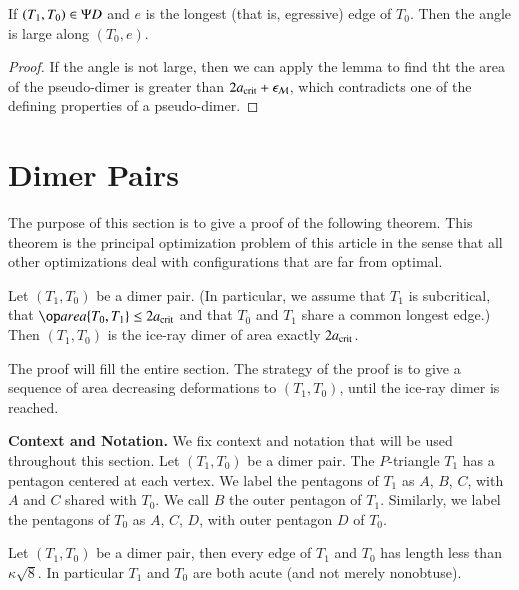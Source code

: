 \begin{corollary}
  If $(T_1,T_0)\in \Psi D$ and $e$ is the longest (that is, egressive)
  edge of $T_0$.  Then the angle is large along $(T_0,e)$.
\end{corollary}

\begin{proof} 
  If the angle is not large, then we can apply the lemma to find tht
  the area of the pseudo-dimer is greater than $2a_\text{crit} + \epsilon_{\mathcal M}$,
  which contradicts one of the defining properties of a pseudo-dimer.
\end{proof}



\section{Dimer Pairs}

The purpose of this section is to give a proof of the following
theorem.  This theorem is the principal optimization problem of this
article in the sense that all other optimizations deal with
configurations that are far from optimal.


\begin{theorem}
  Let $(T_1,T_0)$ be a dimer pair.  (In particular, we assume that
  $T_1$ is subcritical, that $\area\{T_0,T_1\}\le 2\acrit$ and that
  $T_0$ and $T_1$ share a common longest edge.)  Then $(T_1,T_0)$ is
  the ice-ray dimer of area exactly $2a_\text{crit}$.
\end{theorem}

The proof will fill the entire section.  The strategy of the proof is
to give a sequence of area decreasing deformations to $(T_1,T_0)$,
until the ice-ray dimer is reached.


\noindent
{\bf Context and Notation.} We fix context and
notation that will be used throughout this section. Let
$(T_1,T_0)$ be a dimer pair.  The $P$-triangle $T_1$ has a pentagon
centered at each vertex.  We label the pentagons of $T_1$ as $A$, $B$,
$C$, with $A$ and $C$ shared with $T_0$.  We call $B$ the outer
pentagon of $T_1$.  Similarly, we label the pentagons of $T_0$ as $A$,
$C$, $D$, with outer pentagon $D$ of $T_0$.


\begin{lemma}  
  Let $(T_1,T_0)$ be a dimer pair, then every edge of $T_1$ and $T_0$
  has length less than $\kappa\sqrt8$.  In particular $T_1$ and $T_0$
  are both acute (and not merely nonobtuse).
\end{lemma}

